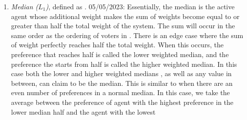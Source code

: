 \begin{enumerate}
    \item {
        \textit{Median ($L_1$)}, defined as
        $$.
         05/05/2023: 
        Essentially, the median is the active agent whose additional weight makes the
        sum of weights become equal to or greater than half the total weight of the
        system.
        The sum will occur in the same order as the ordering of voters in
        \systemproxies.
        There is an edge case where the sum of weight perfectly reaches half the
        total weight.
        When this occurs, the preference that reaches half is called the lower
        weighted median, and the preference the starts from half is called the higher
        weighted median.
        In this case both the lower and higher weighted medians
        , as well as any value in between, can claim to be the median.
        This is similar to when there are an even number of preferences in a normal
        median.
        In this case, we take the average between the preference of agent with
        the highest preference in the lower median half and the agent with the lowest
}
\end{enumerate}
